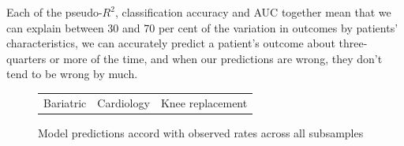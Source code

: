 \documentclass[submission]{grattan}
\begin{document}
Each of the pseudo-\(R^2\), classification accuracy and AUC together mean that we can explain between 30 and 70 per cent of the variation in outcomes by patients' characteristics, we can accurately predict a patient's outcome about three-quarters or more of the time, and when our predictions are wrong, they don't tend to be wrong by much.

\begin{figure}
\caption{Model predictions accord with observed rates across all subsamples}\label{fig:model-predictions-accord-with-observed-rates}
\begin{tabularx}{\linewidth}{@{}C@{}C@{}C@{}}
Bariatric & Cardiology & Knee replacement \\
\cmidrule(lr){1-1}\cmidrule(lr){2-2}\cmidrule(lr){3-3}

\end{tabularx}
\end{figure}
\end{document}
